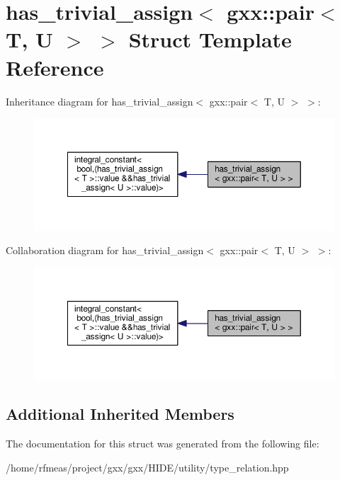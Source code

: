 \hypertarget{structhas__trivial__assign_3_01gxx_1_1pair_3_01T_00_01U_01_4_01_4}{}\section{has\+\_\+trivial\+\_\+assign$<$ gxx\+:\+:pair$<$ T, U $>$ $>$ Struct Template Reference}
\label{structhas__trivial__assign_3_01gxx_1_1pair_3_01T_00_01U_01_4_01_4}


Inheritance diagram for has\+\_\+trivial\+\_\+assign$<$ gxx\+:\+:pair$<$ T, U $>$ $>$\+:
\nopagebreak
\begin{figure}[H]
\begin{center}
\leavevmode
\includegraphics[width=350pt]{structhas__trivial__assign_3_01gxx_1_1pair_3_01T_00_01U_01_4_01_4__inherit__graph}
\end{center}
\end{figure}


Collaboration diagram for has\+\_\+trivial\+\_\+assign$<$ gxx\+:\+:pair$<$ T, U $>$ $>$\+:
\nopagebreak
\begin{figure}[H]
\begin{center}
\leavevmode
\includegraphics[width=350pt]{structhas__trivial__assign_3_01gxx_1_1pair_3_01T_00_01U_01_4_01_4__coll__graph}
\end{center}
\end{figure}
\subsection*{Additional Inherited Members}


The documentation for this struct was generated from the following file\+:\begin{DoxyCompactItemize}
\item 
/home/rfmeas/project/gxx/gxx/\+H\+I\+D\+E/utility/type\+\_\+relation.\+hpp\end{DoxyCompactItemize}
